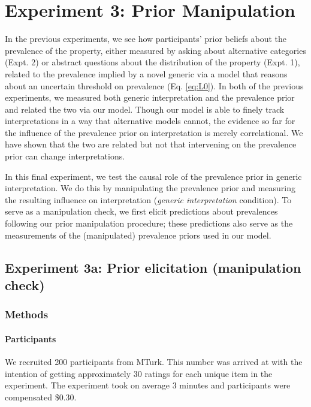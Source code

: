 \documentclass[floatsintext,doc]{apa6}
\theoremstyle{definition}
\theoremstyle{definition}
\theoremstyle{definition}
\theoremstyle{remark}
\begin{document}
\section{Experiment 3: Prior
Manipulation}\label{experiment-3-prior-manipulation}

In the previous experiments, we see how participants' prior beliefs
about the prevalence of the property, either measured by asking about
alternative categories (Expt. 2) or abstract questions about the
distribution of the property (Expt. 1), related to the prevalence
implied by a novel generic via a model that reasons about an uncertain
threshold on prevalence (Eq. \ref{eq:L0}). In both of the previous
experiments, we measured both generic interpretation and the prevalence
prior and related the two via our model. Though our model is able to
finely track interpretations in a way that alternative models cannot,
the evidence so far for the influence of the prevalence prior on
interpretation is merely correlational. We have shown that the two are
related but not that intervening on the prevalence prior can change
interpretations.

In this final experiment, we test the causal role of the prevalence
prior in generic interpretation. We do this by manipulating the
prevalence prior and measuring the resulting influence on interpretation
(\emph{generic interpretation} condition). To serve as a manipulation
check, we first elicit predictions about prevalences following our prior
manipulation procedure; these predictions also serve as the measurements
of the (manipulated) prevalence priors used in our model.

\subsection{Experiment 3a: Prior elicitation (manipulation
check)}\label{experiment-3a-prior-elicitation-manipulation-check}

\subsubsection{Methods}\label{methods-2}

\paragraph{Participants}\label{participants-4}

We recruited 200 participants from MTurk. This number was arrived at
with the intention of getting approximately 30 ratings for each unique
item in the experiment. The experiment took on average 3 minutes and
participants were compensated \$0.30.
\end{document}
